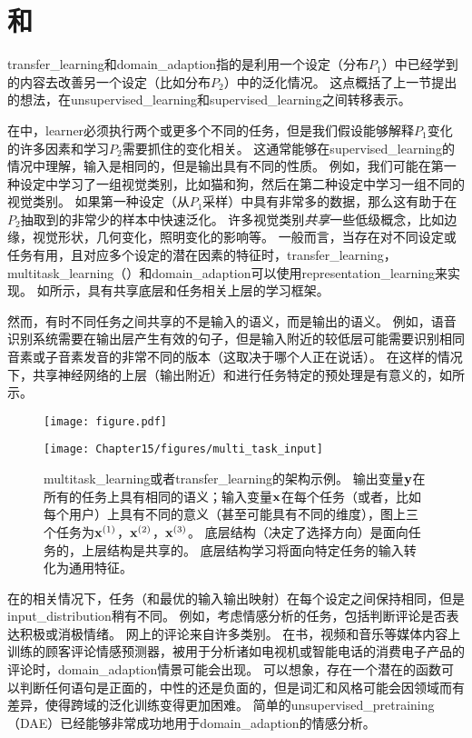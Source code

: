 
\section{和}
\label{sec:transfer_learning_and_domain_adaptation}
\gls{transfer_learning}和\gls{domain_adaption}指的是利用一个设定（分布$P_1$）中已经学到的内容去改善另一个设定（比如分布$P_2$）中的泛化情况。
这点概括了上一节提出的想法，在\gls{unsupervised_learning}和\gls{supervised_learning}之间转移表示。


在中，\gls{learner}必须执行两个或更多个不同的任务，但是我们假设能够解释$P_1$变化的许多因素和学习$P_2$需要抓住的变化相关。
这通常能够在\gls{supervised_learning}的情况中理解，输入是相同的，但是输出具有不同的性质。
例如，我们可能在第一种设定中学习了一组视觉类别，比如猫和狗，然后在第二种设定中学习一组不同的视觉类别。
如果第一种设定（从$P_1$采样）中具有非常多的数据，那么这有助于在$P_2$抽取到的非常少的样本中快速泛化。
许多视觉类别\emph{共享}一些低级概念，比如边缘，视觉形状，几何变化，照明变化的影响等。
一般而言，当存在对不同设定或任务有用，且对应多个设定的潜在因素的特征时，\gls{transfer_learning}，\gls{multitask_learning}（）和\gls{domain_adaption}可以使用\gls{representation_learning}来实现。
如所示，具有共享底层和任务相关上层的学习框架。


然而，有时不同任务之间共享的不是输入的语义，而是输出的语义。
例如，语音识别系统需要在输出层产生有效的句子，但是输入附近的较低层可能需要识别相同音素或子音素发音的非常不同的版本（这取决于哪个人正在说话）。
在这样的情况下，共享神经网络的上层（输出附近）和进行任务特定的预处理是有意义的，如所示。

\begin{figure}[!htb]
\ifOpenSource
\centerline{\texttt{[image: figure.pdf]}}
\else
\centerline{\texttt{[image: Chapter15/figures/multi\_task\_input]}}
\fi
\caption{\gls{multitask_learning}或者\gls{transfer_learning}的架构示例。
输出变量$\mathbf{y}$在所有的任务上具有相同的语义；输入变量$\mathbf{x}$在每个任务（或者，比如每个用户）上具有不同的意义（甚至可能具有不同的维度），图上三个任务为$\mathbf{x}^{(1)}$，$\mathbf{x}^{(2)}$，$\mathbf{x}^{(3)}$。
底层结构（决定了选择方向）是面向任务的，上层结构是共享的。
底层结构学习将面向特定任务的输入转化为通用特征。
}
\label{fig:chap15_multi_task_input}
\end{figure}

在的相关情况下，任务（和最优的输入输出映射）在每个设定之间保持相同，但是\gls{input_distribution}稍有不同。 
例如，考虑情感分析的任务，包括判断评论是否表达积极或消极情绪。 
网上的评论来自许多类别。
在书，视频和音乐等媒体内容上训练的顾客评论情感预测器，被用于分析诸如电视机或智能电话的消费电子产品的评论时，\gls{domain_adaption}情景可能会出现。
可以想象，存在一个潜在的函数可以判断任何语句是正面的，中性的还是负面的，但是词汇和风格可能会因领域而有差异，使得跨域的泛化训练变得更加困难。
简单的\gls{unsupervised_pretraining}（\gls{DAE}）已经能够非常成功地用于\gls{domain_adaption}的情感分析\citep{Glorot+al-ICML-2011}。

